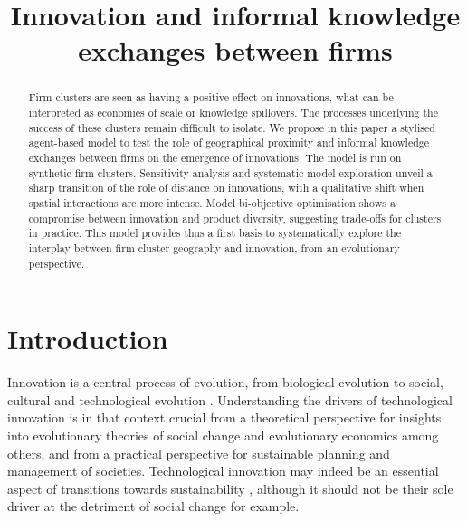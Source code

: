 \documentclass[letterpaper]{article}
\title{Innovation and informal knowledge exchanges between firms}
\begin{document}
\maketitle

\begin{abstract}
Firm clusters are seen as having a positive effect on innovations, what can be interpreted as economies of scale or knowledge spillovers. The processes underlying the success of these clusters remain difficult to isolate. We propose in this paper a stylised agent-based model to test the role of geographical proximity and informal knowledge exchanges between firms on the emergence of innovations. The model is run on synthetic firm clusters. Sensitivity analysis and systematic model exploration unveil a sharp transition of the role of distance on innovations, with a qualitative shift when spatial interactions are more intense. Model bi-objective optimisation shows a compromise between innovation and product diversity, suggesting trade-offs for clusters in practice. This model provides thus a first basis to systematically explore the interplay between firm cluster geography and innovation, from an evolutionary perspective.
\end{abstract}




\section{Introduction}

Innovation is a central process of evolution, from biological evolution to social, cultural \citep{mesoudi2018cumulative} and technological evolution \citep{sood2005technological}. Understanding the drivers of technological innovation is in that context crucial from a theoretical perspective for insights into evolutionary theories of social change and evolutionary economics among others, and from a practical perspective for sustainable planning and management of societies. Technological innovation may indeed be an essential aspect of transitions towards sustainability \citep{adams2016sustainability}, although it should not be their sole driver at the detriment of social change for example.
\end{document}
